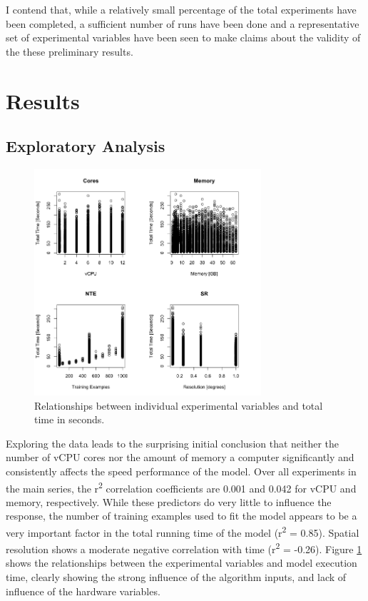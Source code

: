 \documentclass[a4paper]{article}
\begin{document}
I contend that, while a relatively small percentage of the total experiments have been completed, a sufficient number of runs have been done and a representative set of experimental variables have been seen to make claims about the validity of the these preliminary results.

\section{Results}
\subsection{Exploratory Analysis}

\begin{figure}
\centering
\includegraphics[width=0.75\textwidth]{all_vars.png}
\caption{Relationships between individual experimental variables and total time in seconds.} \label{fig:all_vars}
\end{figure}

Exploring the data leads to the surprising initial conclusion that neither the number of vCPU cores nor the amount of memory a computer significantly and consistently affects the speed performance of the model.  Over all experiments in the main series, the r\textsuperscript{2} correlation coefficients are 0.001 and 0.042 for vCPU and memory, respectively.  While these predictors do very little to influence the response, the number of training examples used to fit the model appears to be a very important factor in the total running time of the model (r\textsuperscript{2} = 0.85).  Spatial resolution shows a moderate negative correlation with time (r\textsuperscript{2} = -0.26).  Figure \ref{fig:all_vars} shows the relationships between the experimental variables and model execution time, clearly showing the strong influence of the algorithm inputs, and lack of influence of the hardware variables.
\end{document}
